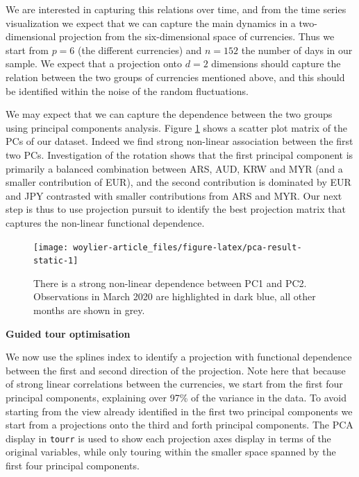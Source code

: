 We are interested in capturing this relations over time, and from the
time series visualization we expect that we can capture the main
dynamics in a two-dimensional projection from the six-dimensional space
of currencies. Thus we start from \(p=6\) (the different currencies) and
\(n=152\) the number of days in our sample. We expect that a projection
onto \(d=2\) dimensions should capture the relation between the two
groups of currencies mentioned above, and this should be identified
within the noise of the random fluctuations.

We may expect that we can capture the dependence between the two groups
using principal components analysis. Figure \ref{fig:pca-result-static}
shows a scatter plot matrix of the PCs of our dataset. Indeed we find
strong non-linear association between the first two PCs. Investigation
of the rotation shows that the first principal component is primarily a
balanced combination between ARS, AUD, KRW and MYR (and a smaller
contribution of EUR), and the second contribution is dominated by EUR
and JPY contrasted with smaller contributions from ARS and MYR. Our next
step is thus to use projection pursuit to identify the best projection
matrix that captures the non-linear functional dependence.

\begin{Schunk}
\begin{figure}

{\centering \texttt{[image: woylier-article\_files/figure-latex/pca-result-static-1]} 

}

\caption[There is a strong non-linear dependence between PC1 and PC2]{There is a strong non-linear dependence between PC1 and PC2. Observations in March 2020 are highlighted in dark blue, all other months are shown in grey.}\label{fig:pca-result-static}
\end{figure}
\end{Schunk}

\textbf{Guided tour optimisation}

We now use the splines index to identify a projection with functional
dependence between the first and second direction of the projection.
Note here that because of strong linear correlations between the
currencies, we start from the first four principal components,
explaining over 97\% of the variance in the data. To avoid starting from
the view already identified in the first two principal components we
start from a projections onto the third and forth principal components.
The PCA display in \texttt{tourr} is used to show each projection axes
display in terms of the original variables, while only touring within
the smaller space spanned by the first four principal components.

